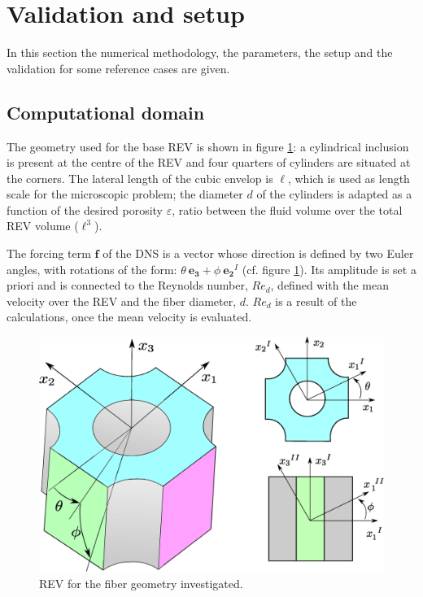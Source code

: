 \section{Validation and setup }



In this section the numerical methodology, the parameters, the setup and the validation for some reference cases are given.



\subsection{Computational domain}



The geometry used for the base REV is shown in figure \ref{fig:cell_3d}: a cylindrical inclusion is present at the centre of the REV and four quarters of cylinders are situated at the corners. The lateral length of the cubic envelop is $\ell$, which is used as length scale for the microscopic problem; the diameter $d$ of the cylinders is adapted as a function of the desired porosity $\varepsilon$, ratio between the fluid volume over the total REV volume ($\ell^3$). 

The  forcing term $\mathbf{f}$ of the DNS  is a vector whose direction is defined by two Euler angles, with rotations of the form:  $\theta \ \mathbf{e_3} + \phi \ \mathbf{e_2}^{I}$ (cf. figure \ref{fig:cell_3d}). Its amplitude is set a priori and is connected to the Reynolds number, $Re_d$, defined with the mean velocity over the REV and the fiber diameter, $d$. $Re_d$ is a result of the calculations, once the mean velocity is evaluated.

\begin{figure}[h]
	\centering
	\includegraphics[width=0.8\linewidth]{chapter_4/figure/cell_3d}
	\caption{REV for the fiber geometry investigated.}
	\label{fig:cell_3d}
\end{figure}


